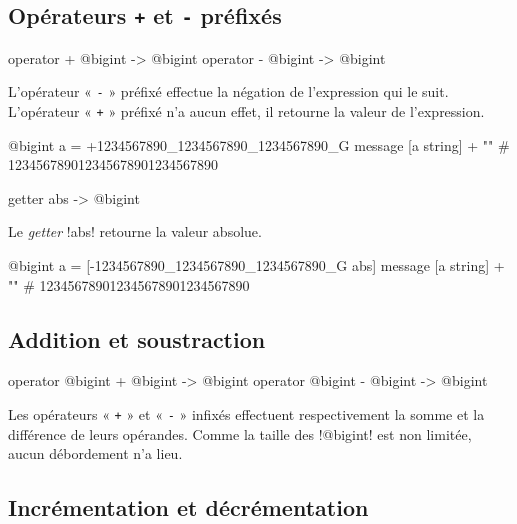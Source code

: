 \subsection{Opérateurs \texttt{+} et \texttt{-} préfixés}

\begin{galgasbox}
operator + @bigint -> @bigint
operator - @bigint -> @bigint
\end{galgasbox}

L'opérateur « \texttt{-} » préfixé effectue la négation de l'expression qui le suit. L'opérateur « \texttt{+} » préfixé n'a aucun effet, il retourne la valeur de l'expression.

\begin{galgas}
@bigint a = +1234567890_1234567890_1234567890_G
message [a string] + "\n" # 123456789012345678901234567890
\end{galgas}










\begin{galgasbox}
getter abs -> @bigint
\end{galgasbox}

Le \emph{getter} \ggs!abs! retourne la valeur absolue.

\begin{galgas}
@bigint a = [-1234567890_1234567890_1234567890_G abs]
message [a string] + "\n" # 123456789012345678901234567890
\end{galgas}






\subsection{Addition et soustraction}

\begin{galgasbox}
operator @bigint + @bigint -> @bigint
operator @bigint - @bigint -> @bigint
\end{galgasbox}

Les opérateurs « \texttt{+} » et « \texttt{-} » infixés effectuent respectivement la somme et la différence de leurs opérandes. Comme la taille des \ggs!@bigint! est non limitée, aucun débordement n'a lieu.


\subsection{Incrémentation et décrémentation}

